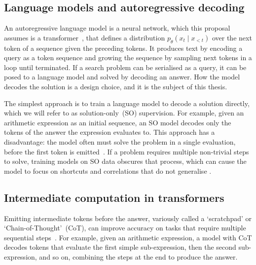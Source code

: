 \subsection{Language models and autoregressive decoding}
\label{sec:bg_reasoning_intro}

An autoregressive language model is a neural network, which this proposal assumes is a transformer~\citep{vaswaniAttentionAllYou2017,radfordLanguageModelsAre}, that defines a distribution $p_\theta(x_t \mid x_{<t})$ over the next token of a sequence given the preceding tokens.
It produces text by encoding a query as a token sequence and growing the sequence by sampling next tokens in a loop until terminated.
If a search problem can be serialised as a query, it can be posed to a language model and solved by decoding an answer.
How the model decodes the solution is a design choice, and it is the subject of this thesis.

The simplest approach is to train a language model to decode a solution directly, which we will refer to as solution-only~(SO) supervision.
For example, given an arithmetic expression as an initial sequence, an SO model decodes only the tokens of the answer the expression evaluates to.
This approach has a disadvantage: the model often must solve the problem in a single evaluation, before the first token is emitted~\citep{bachmannPitfallsNexttokenPrediction2025}.
If a problem requires multiple non-trivial steps to solve, training models on SO data obscures that process, which can cause the model to focus on shortcuts and correlations that do not generalise \citep{geirhosShortcutLearning2020,liuTransformersLearnShortcuts2023}.

\subsection{Intermediate computation in transformers}
\label{sec:bg_reasoning_intermediate_comp}

Emitting intermediate tokens before the answer, variously called a `scratchpad' or `Chain-of-Thought'~(CoT), can improve accuracy on tasks that require multiple sequential steps~\citep{weiChainofThoughtPromptingElicits2023,kojimaLargeLanguageModels2022,nyeShowYourWork2021}.
For example, given an arithmetic expression, a model with CoT decodes tokens that evaluate the first simple sub-expression, then the second sub-expression, and so on, combining the steps at the end to produce the answer.

